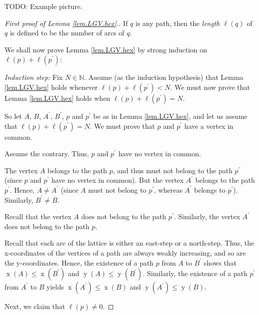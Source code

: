 \documentclass[reqno]{amsart}%
\newcommand{\0}{\phantom{c}}
\newcommand{\defn}[1]{{\color{darkred}\emph{#1}}}
\theoremstyle{plain}
\theoremstyle{definition}
\numberwithin{equation}{section}
\begin{document}
TODO: Example picture.

\begin{proof}
[First proof of Lemma \ref{lem.LGV.hex}.]If $q$ is any path, then the
\defn{length $\ell\left(q\right)$} of $q$ is defined to be the number of arcs
of $q$.

We shall now prove Lemma \ref{lem.LGV.hex} by strong induction on $\ell\left(
p\right)  +\ell\left(  p^{\prime}\right)  $:

\textit{Induction step:} Fix $N\in\mathbb{N}$. Assume (as the induction
hypothesis) that Lemma \ref{lem.LGV.hex} holds whenever $\ell\left(  p\right)
+\ell\left(  p^{\prime}\right)  <N$. We must now prove that Lemma
\ref{lem.LGV.hex} holds when $\ell\left(  p\right)  +\ell\left(  p^{\prime
}\right)  =N$.

So let $A$, $B$, $A^{\prime}$, $B^{\prime}$, $p$ and $p^{\prime}$ be as in
Lemma \ref{lem.LGV.hex}, and let us assume that $\ell\left(  p\right)
+\ell\left(  p^{\prime}\right)  =N$. We must prove that $p$ and $p^{\prime}$
have a vertex in common.

Assume the contrary. Thus, $p$ and $p^{\prime}$ have no vertex in common.

The vertex $A$ belongs to the path $p$, and thus must not belong to the path
$p^{\prime}$ (since $p$ and $p^{\prime}$ have no vertex in common). But the
vertex $A^{\prime}$ belongs to the path $p^{\prime}$. Hence, $A\neq A^{\prime
}$ (since $A$ must not belong to $p^{\prime}$, whereas $A^{\prime}$ belongs to
$p^{\prime}$). Similarly, $B^{\prime}\neq B$.

Recall that the vertex $A$ does not belong to the path $p^{\prime}$.
Similarly, the vertex $A^{\prime}$ does not belong to the path $p$.

Recall that each arc of the lattice is either an east-step or a north-step.
Thus, the x-coordinates of the vertices of a path are always weakly
increasing, and so are the y-coordinates. Hence, the existence of a path $p$
from $A$ to $B^{\prime}$ shows that $\operatorname*{x}\left(  A\right)
\leq\operatorname*{x}\left(  B^{\prime}\right)  $ and $\operatorname*{y}%
\left(  A\right)  \leq\operatorname*{y}\left(  B^{\prime}\right)  $.
Similarly, the existence of a path $p^{\prime}$ from $A^{\prime}$ to $B$
yields $\operatorname*{x}\left(  A^{\prime}\right)  \leq\operatorname*{x}%
\left(  B\right)  $ and $\operatorname*{y}\left(  A^{\prime}\right)
\leq\operatorname*{y}\left(  B\right)  $.

Next, we claim that $\ell\left(  p\right)  \neq0$.


\end{proof}
\end{document}
